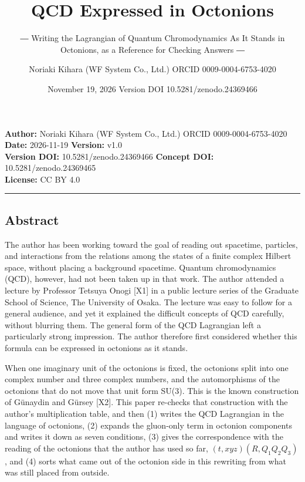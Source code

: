 \documentclass[
  a4paper,
]{article}
\title{QCD Expressed in Octonions}
\subtitle{― Writing the Lagrangian of Quantum Chromodynamics As It
Stands in Octonions, as a Reference for Checking Answers ―}
\author{Noriaki Kihara (WF System Co., Ltd.) ORCID 0009-0004-6753-4020}
\date{November 19, 2026 Version DOI 10.5281/zenodo.24369466}
\begin{document}
\maketitle

\textbf{Author:} Noriaki Kihara (WF System Co., Ltd.) ORCID
0009-0004-6753-4020\\
\textbf{Date:} 2026-11-19 \textbf{Version:} v1.0\\
\textbf{Version DOI:} 10.5281/zenodo.24369466 \textbf{Concept DOI:}
10.5281/zenodo.24369465\\
\textbf{License:} CC BY 4.0

\begin{center}\rule{0.5\linewidth}{0.5pt}\end{center}

\subsection{Abstract}\label{abstract}

The author has been working toward the goal of reading out spacetime,
particles, and interactions from the relations among the states of a
finite complex Hilbert space, without placing a background spacetime.
Quantum chromodynamics (QCD), however, had not been taken up in that
work. The author attended a lecture by Professor Tetsuya Onogi {[}X1{]}
in a public lecture series of the Graduate School of Science, The
University of Osaka. The lecture was easy to follow for a general
audience, and yet it explained the difficult concepts of QCD carefully,
without blurring them. The general form of the QCD Lagrangian left a
particularly strong impression. The author therefore first considered
whether this formula can be expressed in octonions as it stands.

When one imaginary unit of the octonions is fixed, the octonions split
into one complex number and three complex numbers, and the automorphisms
of the octonions that do not move that unit form SU(3). This is the
known construction of Günaydin and Gürsey {[}X2{]}. This paper re-checks
that construction with the author's multiplication table, and then (1)
writes the QCD Lagrangian in the language of octonions, (2) expands the
gluon-only term in octonion components and writes it down as seven
conditions, (3) gives the correspondence with the reading of the
octonions that the author has used so far, \((t, xyz)(R, Q_1Q_2Q_3)\),
and (4) sorts what came out of the octonion side in this rewriting from
what was still placed from outside.
\end{document}
